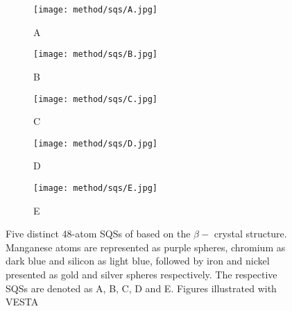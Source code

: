 \begin{figure}[H]
\begin{subfigure}{0.5\textwidth}
\texttt{[image: method/sqs/A.jpg]}
\caption{A}
\end{subfigure}
\hfill
\begin{subfigure}{0.5\textwidth}
\texttt{[image: method/sqs/B.jpg]}
\caption{B}
\end{subfigure}
\begin{subfigure}{0.5\textwidth}
\texttt{[image: method/sqs/C.jpg]}
\caption{C}
\end{subfigure}
\hfill
\begin{subfigure}{0.5\textwidth}
\texttt{[image: method/sqs/D.jpg]}
\caption{D}
\end{subfigure}
\begin{subfigure}{0.5\textwidth}
\texttt{[image: method/sqs/E.jpg]}
\caption{E}
\end{subfigure}
\caption{Five distinct 48-atom SQSs of  based on the $\beta-$  crystal structure. Manganese atoms are represented as purple spheres, chromium as dark blue and silicon as light blue, followed by iron and nickel presented as gold and silver spheres respectively. The respective SQSs are denoted as A, B, C, D and E. Figures illustrated with VESTA \cite{vesta}}
\label{sqs_FeSi2}
\end{figure}
